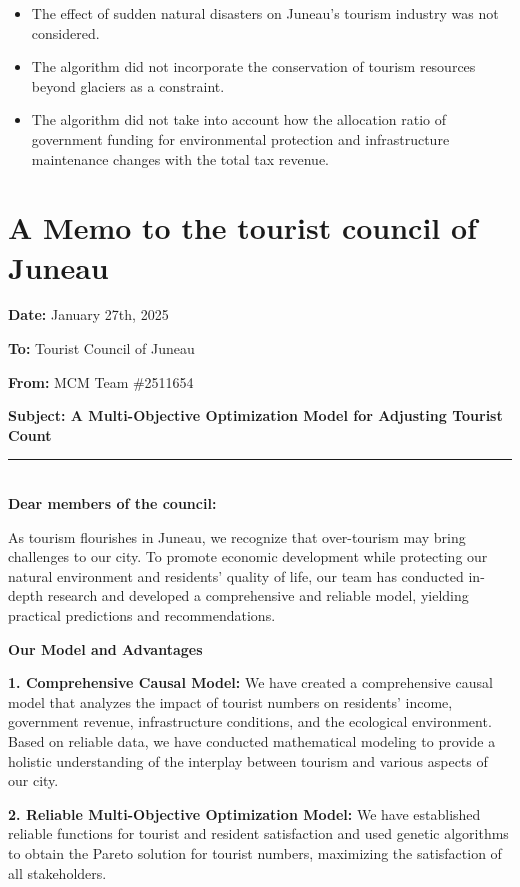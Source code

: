 \documentclass[12pt]{article}  %
\begin{document}
 \begin{itemize}
    \setlength{\parsep}{0ex} %
     \setlength{\topsep}{2ex} %
     \setlength{\itemsep}{1ex} %
      \item The effect of sudden natural disasters on Juneau's tourism industry was not considered.
      \item The algorithm did not incorporate the conservation of tourism resources beyond glaciers as a constraint.
      \item The algorithm did not take into account how the allocation ratio of government funding for environmental protection and infrastructure maintenance changes with the total tax revenue.
 \end{itemize}
 
 
 \clearpage
 \section{A Memo to the tourist council of Juneau}
 \noindent
 \textbf{Date:} January 27th, 2025

 \noindent
 \textbf{To:} Tourist Council of Juneau

 \noindent
 \textbf{From:} MCM Team \#2511654

 \noindent
 \textbf{Subject: A Multi-Objective Optimization Model for Adjusting Tourist Count}
 {\noindent}	 \rule[-0pt]{16.5cm}{0.15em}\\
\noindent
\textbf{Dear members of the council:}

As tourism flourishes in Juneau, we recognize that over-tourism may bring challenges to our city. To promote economic development while protecting our natural environment and residents' quality of life, our team has conducted in-depth research and developed a comprehensive and reliable model, yielding practical predictions and recommendations.

\noindent
\textbf{Our Model and Advantages}

\textbf{1. Comprehensive Causal Model:} We have created a comprehensive causal model that analyzes the impact of tourist numbers on residents' income, government revenue, infrastructure conditions, and the ecological environment. Based on reliable data, we have conducted mathematical modeling to provide a holistic understanding of the interplay between tourism and various aspects of our city.

\textbf{2. Reliable Multi-Objective Optimization Model:} We have established reliable functions for tourist and resident satisfaction and used genetic algorithms to obtain the Pareto solution for tourist numbers, maximizing the satisfaction of all stakeholders.
\end{document}
